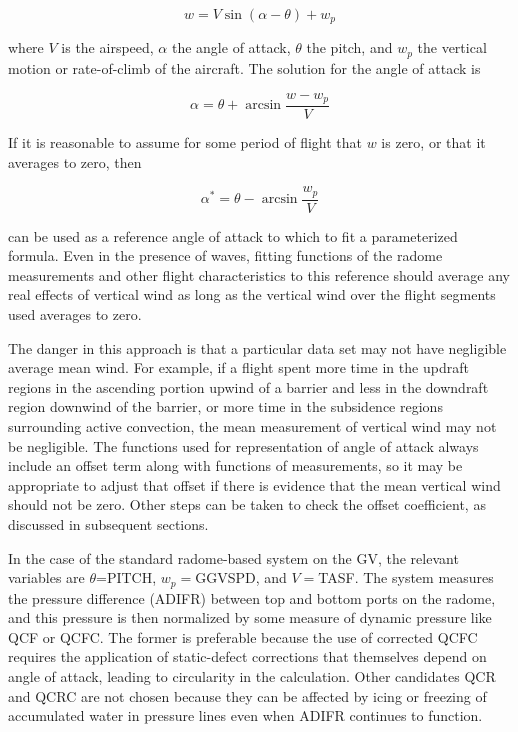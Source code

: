 \documentclass[12pt,twoside,english]{article}\usepackage[]{graphicx}\usepackage[]{color}
\let\OrgIndex\index
\renewcommand*{\index}[1]{\OrgIndex{#1}}
\begin{document}
{{\begin{equation}
w=V\sin(\alpha-\theta)+w_{p}\label{eq:VWind} 
\end{equation}


where $V$ is the airspeed, $\alpha$ the angle of attack, $\theta$ the pitch, and $w_{p}$ the vertical motion or rate-of-climb of the aircraft. The solution for the angle of attack is 

\begin{equation}
\alpha=\theta+\arcsin\frac{w-w_{p}}{V}\label{eq:SolvedForAOA} 
\end{equation}


If it is reasonable to assume for some period of flight that $w$ is zero, or that it averages to zero, then 

\begin{equation}
\alpha^{*}=\theta-\arcsin\frac{w_{p}}{V}\label{eq:alphaWithwZero} 
\end{equation}


can be used as a reference angle of attack to which to fit a parameterized formula. Even in the presence of waves, fitting functions of the radome measurements and other flight characteristics to this reference should average any real effects of vertical wind as long as the vertical wind over the flight segments used averages to zero. 

The danger in this approach is that a particular data set may not have negligible average mean wind. For example, if a flight spent more time in the updraft regions in the ascending portion upwind of a barrier and less in the downdraft region downwind of the barrier, or more time in the subsidence regions surrounding active convection, the mean measurement of vertical wind may not be negligible. The functions used for representation of angle of attack always include an offset term along with functions of measurements, so it may be appropriate to adjust that offset if there is evidence that the mean vertical wind should not be zero. Other steps can be taken to check the offset coefficient, as discussed in subsequent sections. 

In the case of the standard radome-based system on the GV, the relevant variables are $\theta$=PITCH, $w_{p}=$GGVSPD, and $V=$TASF. The system measures the pressure difference (ADIFR) between top and bottom ports on the radome, and this pressure is then normalized by some measure of dynamic pressure like QCF or QCFC. The former is preferable because the use of corrected QCFC requires the application of static-defect corrections that themselves depend on angle of attack, leading to circularity in the calculation. Other candidates QCR and QCRC are not chosen because they can be affected by icing or freezing of accumulated water in pressure lines even when ADIFR continues to function. 

}}
\end{document}
